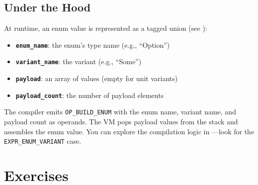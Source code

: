 \subsection{Under the Hood}

At runtime, an enum value is represented as a tagged union (see
):

\begin{itemize}
  \item \textbf{\texttt{enum\_name}}: the enum's type name (e.g., ``Option'')
  \item \textbf{\texttt{variant\_name}}: the variant (e.g., ``Some'')
  \item \textbf{\texttt{payload}}: an array of values (empty for unit
    variants)
  \item \textbf{\texttt{payload\_count}}: the number of payload elements
\end{itemize}

The compiler emits \texttt{OP\_BUILD\_ENUM} with the enum name, variant name,
and payload count as operands. The VM pops payload values from the stack
and assembles the enum value. You can explore the compilation logic in
---look for the \texttt{EXPR\_ENUM\_VARIANT}
case.

\section{Exercises}\label{sec:enum-exercises}

